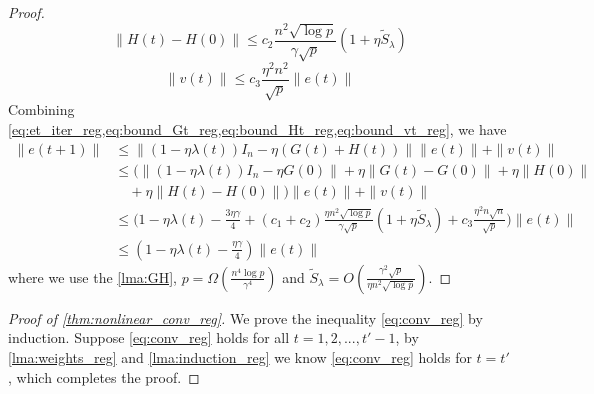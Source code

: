 \begin{proof}
\begin{equation}\label{eq:bound_Ht_reg}
    \|H(t)-H(0)\| \leq c_2\frac{n^2\sqrt{\log p}}{\gamma\sqrt p}(1+\eta \tilde{S}_\lambda)
\end{equation}
\begin{equation}\label{eq:bound_vt_reg}
    \|v(t)\| \leq c_3\frac{\eta^2n^2}{\sqrt p}\|e(t)\|
\end{equation}
Combining \cref{eq:et_iter_reg,eq:bound_Gt_reg,eq:bound_Ht_reg,eq:bound_vt_reg}, we have
\begin{equation*}
\begin{aligned}
\|e(t+1)\|
&\leq \|(1-\eta\lambda(t))I_n-\eta (G(t)+H(t))\|\|e(t)\|+\|v(t)\| \\
&\leq \Big(\|(1-\eta\lambda(t))I_n-\eta G(0)\|+\eta\|G(t)-G(0)\|+\eta\|H(0)\| \\
&\quad +\eta\|H(t)-H(0)\|\Big)\|e(t)\| + \|v(t)\| \\
&\leq \Big( 1-\eta\lambda(t)-\frac{3\eta\gamma}{4}+(c_1+ c_2)\frac{\eta n^2\sqrt{\log p}}{\gamma\sqrt p}(1+\eta \tilde{S}_\lambda)+c_3\frac{\eta^2n\sqrt n}{\sqrt p}\Big)\|e(t)\|  \\
&\leq(1-\eta\lambda(t)-\frac{\eta\gamma}{4})\|e(t)\|
\end{aligned}
\end{equation*}
where we use the \cref{lma:GH}, $p=\Omega(\frac{n^4\log p}{\gamma^4})$ and $\tilde{S}_\lambda = O(\frac{\gamma^2\sqrt{p}}{\eta n^2\sqrt{\log p}})$.
\end{proof}

\begin{proof}[Proof of \cref{thm:nonlinear_conv_reg}]
We prove the inequality \eqref{eq:conv_reg} by induction. Suppose \eqref{eq:conv_reg} holds for all $t=1,2,...,t'-1$, by \cref{lma:weights_reg} and \cref{lma:induction_reg} we know \eqref{eq:conv_reg} holds for $t=t'$, which completes the proof.
\end{proof}
